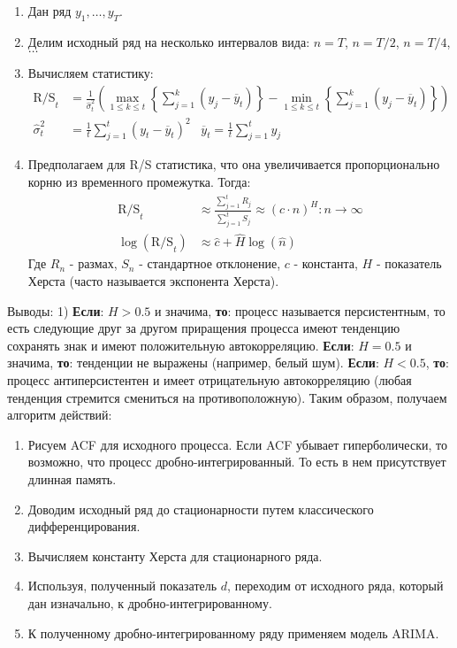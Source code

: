 \begin{enumerate}
	\item Дан ряд $y_1, \ldots, y_{T}$.
	\item Делим исходный ряд на несколько интервалов вида: $n = T$, $n = T / 2$, $n = T / 4$, $\ldots$
	\item Вычисляем статистику:
	\begin{equation}
		\begin{split}
			\text{R/S}_t & = \frac{1}{\hat{\sigma}^2_t} \left(\max_{1 \le k \le t} \left\{\sum_{j = 1}^k (y_j - \overline{y}_t)\right\} - \min_{1 \le k \le t} \left\{\sum_{j = 1}^k (y_j - \overline{y}_t)\right\}\right)\\
			\hat{\sigma}^2_t & = \frac{1}{t} \sum_{j = 1}^t (y_t - \overline{y}_t)^2 \;\;\; \overline{y}_t = \frac{1}{t} \sum_{j = 1}^t y_j
		\end{split}		
	\end{equation}
	\item Предполагаем для R/S статистика, что она увеличивается пропорционально корню из временного промежутка. Тогда:
	\begin{equation}
		\begin{split}
			\text{R/S}_t & \approx \frac{\sum_{j = 1}^t R_j}{\sum_{j = 1}^t S_j} \approx (c \cdot n)^H: n \to \infty\\
			\log\left(\text{R/S}_t\right) & \approx \hat{c} + \hat{H} \log(\hat{n})
		\end{split}
	\end{equation}
	Где $R_n$ - размах, $S_n$ - стандартное отклонение, $c$ - константа, $H$ - показатель Херста (часто называется экспонента Херста).
\end{enumerate}
Выводы: 1) \textbf{Если}: $H > 0.5$ и значима, \textbf{то}: процесс называется персистентным, то есть следующие друг за другом приращения процесса имеют тенденцию сохранять знак и имеют положительную автокорреляцию. \textbf{Если}: $H = 0.5$ и значима, \textbf{то}: тенденции не выражены (например, белый шум). \textbf{Если}: $H < 0.5$, \textbf{то}: процесс антиперсистентен и имеет отрицательную автокорреляцию (любая тенденция стремится смениться на противоположную). Таким образом, получаем алгоритм действий:
\begin{enumerate}
	\item Рисуем ACF для исходного процесса. Если ACF убывает гиперболически, то возможно, что процесс дробно-интегрированный. То есть в нем присутствует длинная память.
	\item Доводим исходный ряд до стационарности путем классического дифференцирования.
	\item Вычисляем константу Херста для стационарного ряда.
	\item Используя, полученный показатель $d$, переходим от исходного ряда, который дан изначально, к дробно-интегрированному.
	\item К полученному дробно-интегрированному ряду применяем модель ARIMA.
\end{enumerate}
